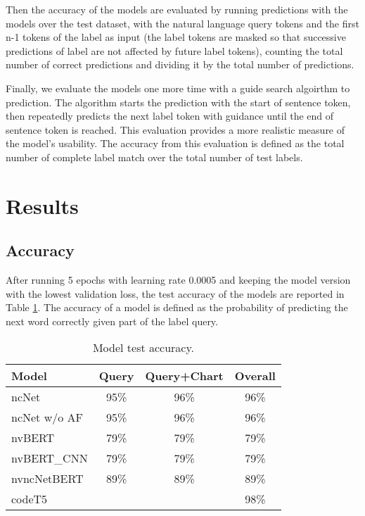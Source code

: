 \documentclass[
	a4paper, %
	10pt, %
	unnumberedsections, %
	twoside, %
]{t0003}
\begin{document}
Then the accuracy of the models are evaluated by running predictions with the models over the test dataset, with the natural language query tokens and the first n-1 tokens of the label as input (the label tokens are masked so that successive predictions of label are not affected by future label tokens), counting the total number of correct predictions and dividing it by the total number of predictions.

Finally, we evaluate the models one more time with a guide search algoirthm to prediction. The algorithm starts the prediction with the start of sentence token, then repeatedly predicts the next label token with guidance until the end of sentence token is reached. This evaluation provides a more realistic measure of the model's usability. The accuracy from this evaluation is defined as the total number of complete label match over the total number of test labels.

\section{Results}

\subsection{Accuracy}

After running 5 epochs with learning rate 0.0005 and keeping the model version with the lowest validation loss, the test accuracy of the models are reported in Table \ref{tab:accuracy}. The accuracy of a model is defined as the probability of predicting the next word correctly given part of the label query.

\begin{table} %
	\caption{Model test accuracy.}
	\centering
	\begin{tabular}{lccc}
		\toprule
		Model & Query & Query+Chart & Overall  \\
		\midrule
		ncNet & 95\% & 96\% & 96\% \\
		ncNet w/o AF & 95\% & 96\% & 96\%  \\
		\hline
		nvBERT & 79\% & 79\% & 79\% \\
		nvBERT\_CNN &  79\% & 79\% & 79\% \\
		\hline
		nvncNetBERT & 89\% & 89\% & 89\% \\
		\hline
		codeT5 & & & 98\% \\
		\bottomrule
	\end{tabular}
	\label{tab:accuracy}
\end{table}
\end{document}
